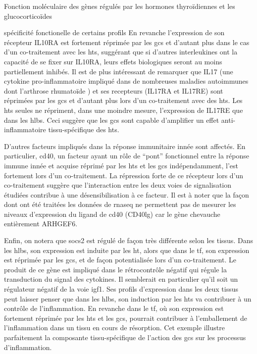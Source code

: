 \documentclass[../main.tex]{subfiles}
\begin{document}
\begin{chapter}{Fonction moléculaire des gènes régulés par les hormones thyroïdiennes et les glucocorticoïdes}
\begin{section}{spécificité fonctionelle de certains profils}
En revanche l'expression de son récepteur IL10RA est fortement réprimée par les \glspl{gc} et d'autant plus dans le cas d'un co-traitement avec les \glspl{ht}, suggérant que si d'autres interleukines ont la capacité de se fixer sur IL10RA, leurs effets biologiques seront au moins partiellement inhibés.
Il est de plus intéressant de remarquer que IL17 (une cytokine pro-inflammatoire impliqué dans de nombreuses maladies autoimmunes dont l'arthrose rhumatoïde \citealp{Onishi2010}) et ses recepteurs (IL17RA et IL17RE) sont réprimées par les \glspl{gc} et d'autant plus lors d'un co-traitement avec des \glspl{ht}.
Les \glspl{ht} seules ne répriment, dans une moindre mesure, l'expression de IL17RE que dans les \glspl{hlb}.
Ceci suggère que les \glspl{gc} sont capable d'amplifier un effet anti-inflammatoire tissu-spécifique des \glspl{ht}.
\par
D'autres facteurs impliqués dans la réponse immunitaire innée sont affectés.
En particulier, \gls{cd40}, un facteur ayant un rôle de ``pont'' fonctionnel entre la réponse immune innée et acquise \citep{Elgueta2009,Fujii2004} réprimé par les \glspl{ht} et les \glspl{gc} indépendamment, l'est fortement lors d'un co-traitement.
La répression forte de ce récepteur lors d'un co-traitement suggère que l'interaction entre les deux voies de signalisation étudiées contribue à une désensibilisation à ce facteur.
Il est à noter que la façon dont ont été traitées les données de \gls{rnaseq} ne permettent pas de mesurer les niveaux d'expression du ligand de \gls{cd40} (CD40lg) car le gène chevauche entièrement ARHGEF6.
\par
Enfin, on notera que \gls{socs2} est régulé de façon très différente selon les tissus.
Dans les \glspl{hlb}, son expression est induite par les \gls{ht}, alors que dans le \gls{tf}, son expression est réprimée par les \glspl{gc}, et de façon potentialisée lors d'un co-traitement.
Le produit de ce gène est impliqué dans le rétrocontrôle négatif qui régule la transduction du signal des cytokines.
Il semblerait en particulier qu'il soit un régulateur négatif de la voie \gls{igf}1.
Ses profils d'expression dans les deux tissus peut laisser penser que dans les \glspl{hlb}, son induction par les \glspl{ht} va contribuer à un contrôle de l'inflammation.
En revanche dans le \gls{tf}, où son expression est fortement réprimée par les \glspl{ht} et les \glspl{gc}, pourrait contribuer à l'emballement de l'inflammation dans un tissu en cours de résorption.
Cet exemple illustre parfaitement la composante tissu-spécifique de l'action des \glspl{gc} sur les processus d'inflammation.



\end{section}
\end{chapter}
\end{document}
